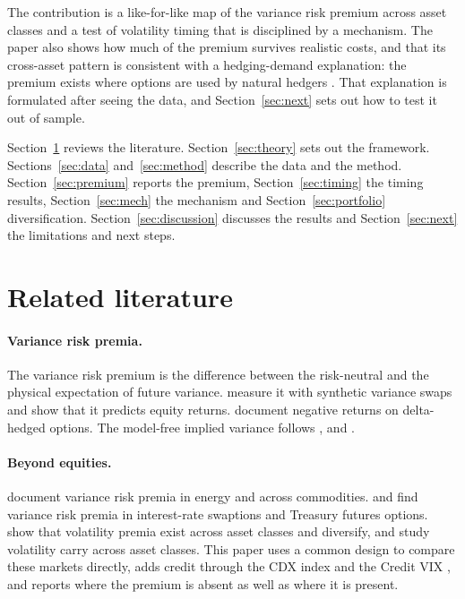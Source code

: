 \documentclass[11pt,a4paper]{article}
\theoremstyle{remark}
\begin{document}
The contribution is a like-for-like map of the variance risk premium across asset classes and a test of volatility timing that is disciplined by a mechanism. The paper also shows how much of the premium survives realistic costs, and that its cross-asset pattern is consistent with a hedging-demand explanation: the premium exists where options are used by natural hedgers \citep{bollenwhaley2004,garleanu2009}. That explanation is formulated after seeing the data, and Section~\ref{sec:next} sets out how to test it out of sample.

Section~\ref{sec:lit} reviews the literature. Section~\ref{sec:theory} sets out the framework. Sections~\ref{sec:data} and~\ref{sec:method} describe the data and the method. Section~\ref{sec:premium} reports the premium, Section~\ref{sec:timing} the timing results, Section~\ref{sec:mech} the mechanism and Section~\ref{sec:portfolio} diversification. Section~\ref{sec:discussion} discusses the results and Section~\ref{sec:next} the limitations and next steps.

\section{Related literature}
\label{sec:lit}

\paragraph{Variance risk premia.} The variance risk premium is the difference between the risk-neutral and the physical expectation of future variance. \citet{carrwu2009} measure it with synthetic variance swaps and \citet{bollerslev2009} show that it predicts equity returns. \citet{bakshikapadia2003} document negative returns on delta-hedged options. The model-free implied variance follows \citet{brittenjones2000}, \citet{demeterfi1999} and \citet{jiangtian2005}.

\paragraph{Beyond equities.} \citet{trolle2010} document variance risk premia in energy and \citet{prokopczuk2017} across commodities. \citet{trolleschwartz2014} and \citet{choi2017} find variance risk premia in interest-rate swaptions and Treasury futures options. \citet{fallon2015} show that volatility premia exist across asset classes and diversify, and \citet{khalfallah2025} study volatility carry across asset classes. This paper uses a common design to compare these markets directly, adds credit through the CDX index and the Credit VIX \citep{spdji_creditvix}, and reports where the premium is absent as well as where it is present.
\end{document}

